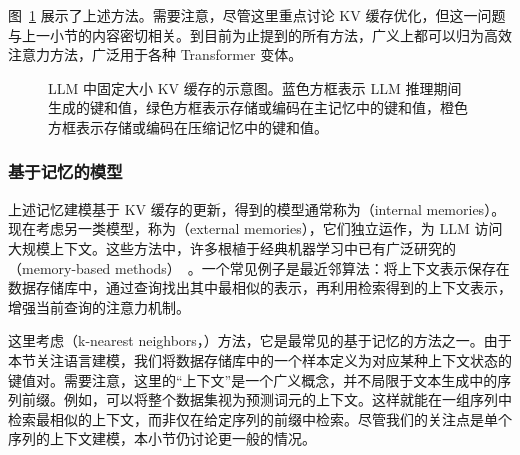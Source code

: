 图~\ref{fig:comparison-kv-cache-optimizations} 展示了上述方法。需要注意，尽管这里重点讨论 KV 缓存优化，但这一问题与上一小节的内容密切相关。到目前为止提到的所有方法，广义上都可以归为高效注意力方法，广泛用于各种 Transformer 变体。

\begin{figure}[!t]
\centering

\caption{LLM 中固定大小 KV 缓存的示意图。蓝色方框表示 LLM 推理期间生成的键和值，绿色方框表示存储或编码在主记忆中的键和值，橙色方框表示存储或编码在压缩记忆中的键和值。}
\label{fig:comparison-kv-cache-optimizations}
\end{figure}

\subsubsection{基于记忆的模型}

\noindent 上述记忆建模基于 KV 缓存的更新，得到的模型通常称为（internal memories）。现在考虑另一类模型，称为（external memories），它们独立运作，为 LLM 访问大规模上下文。这些方法中，许多根植于经典机器学习中已有广泛研究的（memory-based methods）~\cite{Bishop:2006}。一个常见例子是最近邻算法：将上下文表示保存在数据存储库中，通过查询找出其中最相似的表示，再利用检索得到的上下文表示，增强当前查询的注意力机制。

这里考虑（k-nearest neighbors，）方法，它是最常见的基于记忆的方法之一。由于本节关注语言建模，我们将数据存储库中的一个样本定义为对应某种上下文状态的键值对。需要注意，这里的“上下文”是一个广义概念，并不局限于文本生成中的序列前缀。例如，可以将整个数据集视为预测词元的上下文。这样就能在一组序列中检索最相似的上下文，而非仅在给定序列的前缀中检索。尽管我们的关注点是单个序列的上下文建模，本小节仍讨论更一般的情况。

